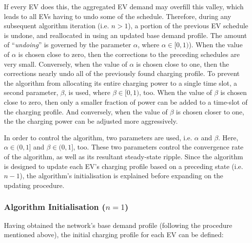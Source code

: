 

If every EV does this, the aggregated EV demand may overfill this valley, which leads to all EVs having to undo some of the schedule.
Therefore, during any subsequent algorithm iteration (i.e. $n>1$), a portion of the previous EV schedule is undone, and reallocated in using an updated base demand profile.
The amount of ``\textit{undoing}'' is governed by the parameter $\alpha$, where $\alpha \in [0, 1)$).
When the value of $\alpha$ is chosen close to zero, then the corrections to the preceding schedules are very small.
Conversely, when the value of $\alpha$ is chosen close to one, then the corrections nearly undo all of the previously found charging profile.
To prevent the algorithm from allocating its entire charging power to a single time slot, a second parameter, $\beta$, is used, where $\beta \in [0, 1)$, too.
When the value of $\beta$ is chosen close to zero, then only a smaller fraction of power can be added to a time-slot of the charging profile.
And conversely, when the value of $\beta$ is chosen closer to one, the the charging power can be adjusted more aggressively.



In order to control the algorithm, two parameters are used, i.e. $\alpha$ and $\beta$.
Here, $\alpha \in (0, 1]$ and $\beta \in (0, 1]$, too.
These two parameters control the convergence rate of the algorithm, as well as its resultant steady-state ripple.
Since the algorithm is designed to update each EV's charging profile based on a preceding state (i.e. $n-1$), the algorithm's initialisation is explained before expanding on the updating procedure.

\subsubsection{Algorithm Initialisation ($n=1$)}

Having obtained the network's base demand profile (following the procedure mentioned above), the initial charging profile for each EV can be defined:














